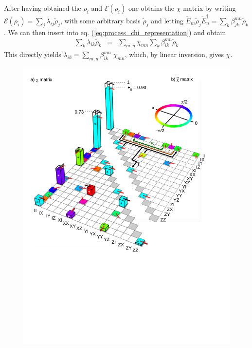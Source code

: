 After having obtained the $\rho_i$ and $\mathcal{E}(\rho_i)$ one obtains the $\chi$-matrix by writing $\mathcal{E}(\rho_i) = \sum_j \lambda_{ij} \tilde{\rho}_j$, with some arbitrary basis $\tilde{\rho}_j$ and
letting $\tilde{E}_m \tilde{\rho}_j \tilde{E}_n^\dagger = \sum_k \beta_{jk}^{mn}\tilde{\rho}_k$. We can then insert into eq. (\ref{eq:process_chi_representation}) and obtain
\begin{eqnarray}
\sum\limits_k \lambda_{ik} \tilde{\rho}_k & = & \sum\limits_{m,n} \chi_{mn} \sum\limits_k \beta_{ik}^{mn} \tilde{\rho}_k  
\end{eqnarray}
This directly yields $\lambda_{ik} = \sum_{m,n}\beta_{ik}^{mn}\; \chi_{mn}$, which, by linear inversion,  gives $\chi$.

\begin{figure}
	\centering
		\includegraphics[width=1.\textwidth]{./material/papers/iswap/figures/chi_matrix_and_error_process}
	\label{fig:GateChiMatrixAndErrorProcess}
	\caption{}
\end{figure}


